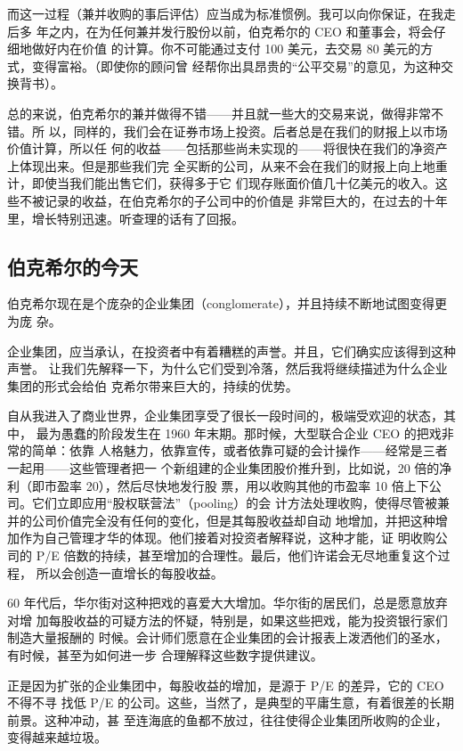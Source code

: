 \documentclass[UTF8,a4paper,zihao=-4,fontset = windows]{ctexart} %
\begin{document}
而这一过程（兼并收购的事后评估）应当成为标准惯例。我可以向你保证，在我走后多
年之内，在为任何兼并发行股份以前，伯克希尔的 CEO 和董事会，将会仔细地做好内在价值
的计算。你不可能通过支付 100 美元，去交易 80 美元的方式，变得富裕。（即使你的顾问曾
经帮你出具昂贵的“公平交易”的意见，为这种交换背书）。

总的来说，伯克希尔的兼并做得不错——并且就一些大的交易来说，做得非常不错。所
以，同样的，我们会在证券市场上投资。后者总是在我们的财报上以市场价值计算，所以任
何的收益——包括那些尚未实现的——将很快在我们的净资产上体现出来。但是那些我们完
全买断的公司，从来不会在我们的财报上向上地重计，即使当我们能出售它们，获得多于它
们现存账面价值几十亿美元的收入。这些不被记录的收益，在伯克希尔的子公司中的价值是
非常巨大的，在过去的十年里，增长特别迅速。听查理的话有了回报。

\subsection{伯克希尔的今天}

伯克希尔现在是个庞杂的企业集团（conglomerate），并且持续不断地试图变得更为庞
杂。

企业集团，应当承认，在投资者中有着糟糕的声誉。并且，它们确实应该得到这种声誉。
让我们先解释一下，为什么它们受到冷落，然后我将继续描述为什么企业集团的形式会给伯
克希尔带来巨大的，持续的优势。

自从我进入了商业世界，企业集团享受了很长一段时间的，极端受欢迎的状态，其中，
最为愚蠢的阶段发生在 1960 年末期。那时候，大型联合企业 CEO 的把戏非常的简单：依靠
人格魅力，依靠宣传，或者依靠可疑的会计操作——经常是三者一起用——这些管理者把一
个新组建的企业集团股价推升到，比如说，20 倍的净利（即市盈率 20），然后尽快地发行股
票，用以收购其他的市盈率 10 倍上下公司。它们立即应用“股权联营法”（pooling）的会
计方法处理收购，使得尽管被兼并的公司价值完全没有任何的变化，但是其每股收益却自动
地增加，并把这种增加作为自己管理才华的体现。他们接着对投资者解释说，这种才能，证
明收购公司的 P/E 倍数的持续，甚至增加的合理性。最后，他们许诺会无尽地重复这个过程，
所以会创造一直增长的每股收益。

60 年代后，华尔街对这种把戏的喜爱大大增加。华尔街的居民们，总是愿意放弃对增
加每股收益的可疑方法的怀疑，特别是，如果这些把戏，能为投资银行家们制造大量报酬的
时候。会计师们愿意在企业集团的会计报表上泼洒他们的圣水，有时候，甚至为如何进一步
合理解释这些数字提供建议。

正是因为扩张的企业集团中，每股收益的增加，是源于 P/E 的差异，它的 CEO 不得不寻
找低 P/E 的公司。这些，当然了，是典型的平庸生意，有着很差的长期前景。这种冲动，甚
至连海底的鱼都不放过，往往使得企业集团所收购的企业，变得越来越垃圾。
\end{document}
